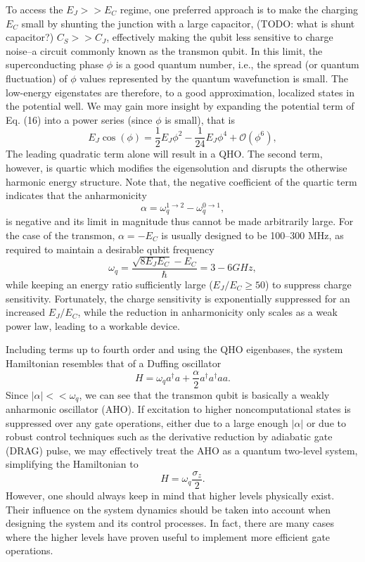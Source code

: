 \documentclass[11pt, oneside]{article}   	%
\begin{document}
To access the $E_J >> E_C$ regime, 
one preferred approach is to make the charging $E_C$ small by shunting the junction with a large capacitor, (TODO: what is shunt capacitor?)
$C_S >> C_J$, effectively making the qubit less sensitive to charge noise--a circuit commonly known as the transmon qubit. 
In this limit, the superconducting phase $\phi$ is a good quantum number, 
i.e., the spread (or quantum fluctuation) of $\phi$ values represented by the quantum wavefunction is small. 
The low-energy eigenstates are therefore, to a good approximation, localized states in the potential well. 
We may gain more insight by expanding the potential term of Eq. (16) into a power series (since $\phi$ is small), that is
\begin{equation*} 
E_J \cos(\phi) = \frac{1}{2} E_J \phi^2 - \frac{1}{24} E_J \phi^4 + \mathcal{O}(\phi^6),
\end{equation*}
The leading quadratic term alone will result in a QHO. 
The second term, however, is quartic which modifies the eigensolution and disrupts the otherwise harmonic energy structure. 
Note that, the negative coefficient of the quartic term indicates that the anharmonicity 
\begin{equation*} 
\alpha = \omega^{1 \to 2}_q - \omega^{0 \to 1}_q,
\end{equation*}
is negative and its limit in magnitude thus cannot be made arbitrarily large. 
For the case of the transmon, 
$\alpha = - E_C$
is usually designed to be 100–300 MHz, as required to maintain a desirable qubit frequency 
\begin{equation*} 
\omega_q = \frac{\sqrt{8 E_J E_C} - E_C}{\hbar} = 3-6 GHz,
\end{equation*}
while keeping an energy ratio sufficiently large ($E_J/E_C \geq 50$) to suppress charge sensitivity. 
Fortunately, the charge sensitivity is exponentially suppressed for an increased $E_J/E_C$, 
while the reduction in anharmonicity only scales as a weak power law, leading to a workable device.

Including terms up to fourth order and using the QHO eigenbases, 
the system Hamiltonian resembles that of a Duffing oscillator
\begin{equation*} 
H = \omega_q a^{\dagger} a + \frac{\alpha}{2} a^{\dagger} a^{\dagger} a a.
\end{equation*}
Since 
$|\alpha| << \omega_q$, 
we can see that the transmon qubit is basically a weakly anharmonic oscillator (AHO). 
If excitation to higher noncomputational states is suppressed over any gate operations, either due to a large enough
$|\alpha|$ 
or due to robust control techniques such as the derivative reduction by adiabatic gate (DRAG) pulse, 
we may effectively treat the AHO as a quantum two-level system, simplifying the Hamiltonian to
\begin{equation*} 
H = \omega_q \frac{\sigma_z}{2}.
\end{equation*}
However, one should always keep in mind that higher levels physically exist.
Their influence on the system dynamics should be taken into account when designing the system and its control processes. 
In fact, there are many cases where the higher levels have proven useful to implement more efficient gate operations.
\end{document}
